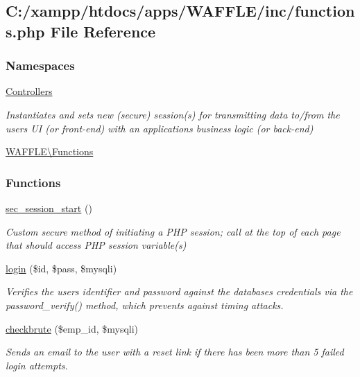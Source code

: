 \hypertarget{functions_8php}{}\subsection{C\+:/xampp/htdocs/apps/\+W\+A\+F\+F\+L\+E/inc/functions.php File Reference}
\label{functions_8php}
\subsubsection*{Namespaces}
\begin{DoxyCompactItemize}
\item 
 \hyperlink{namespace_controllers}{Controllers}
\begin{DoxyCompactList}\small\item\em Instantiates and sets new (secure) session(s) for transmitting data to/from the user\textquotesingle{}s UI (or front-\/end) with an application\textquotesingle{}s business logic (or back-\/end) \end{DoxyCompactList}\item 
 \hyperlink{namespace_w_a_f_f_l_e_1_1_functions}{W\+A\+F\+F\+L\+E\textbackslash{}\+Functions}
\end{DoxyCompactItemize}
\subsubsection*{Functions}
\begin{DoxyCompactItemize}
\item 
\hyperlink{namespace_w_a_f_f_l_e_1_1_functions_a09d3696edbb60db132cbac829c0a96dd}{sec\+\_\+session\+\_\+start} ()
\begin{DoxyCompactList}\small\item\em Custom secure method of initiating a P\+HP session; call at the top of each page that should access P\+HP session variable(s) \end{DoxyCompactList}\item 
\hyperlink{namespace_w_a_f_f_l_e_1_1_functions_a7573c72280bfa987322364343fd97eec}{login} (\$id, \$pass, \$mysqli)
\begin{DoxyCompactList}\small\item\em Verifies the user\textquotesingle{}s identifier and password against the database\textquotesingle{}s credentials via the \textquotesingle{}password\+\_\+verify()\textquotesingle{} method, which prevents against timing attacks. \end{DoxyCompactList}\item 
\hyperlink{namespace_w_a_f_f_l_e_1_1_functions_a0a6eed95810480a504f0334d3c23ccbc}{checkbrute} (\$emp\+\_\+id, \$mysqli)
\begin{DoxyCompactList}\small\item\em Sends an email to the user with a reset link if there has been more than 5 failed login attempts. \end{DoxyCompactList}\end{DoxyCompactItemize}
